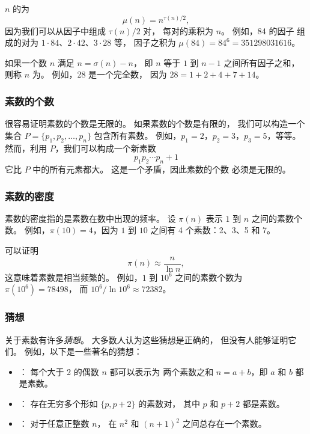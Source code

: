 $n$ 的为
\[\mu(n)=n^{\tau(n)/2},\]
因为我们可以从因子中组成 $\tau(n)/2$ 对，
每对的乘积为 $n$。
例如，84 的因子
组成的对为
$1 \cdot 84$、$2 \cdot 42$、$3 \cdot 28$ 等，
因子之积为 $\mu(84)=84^6=351298031616$。


如果一个数 $n$ 满足 $n=\sigma(n)-n$，
即 $n$ 等于 $1$ 到 $n-1$ 之间所有因子之和，
则称 $n$ 为。
例如，28 是一个完全数，
因为 $28=1+2+4+7+14$。

\subsubsection{素数的个数}

很容易证明素数的个数是无限的。
如果素数的个数是有限的，
我们可以构造一个集合 $P=\{p_1,p_2,\ldots,p_n\}$
包含所有素数。
例如，$p_1=2$，$p_2=3$，$p_3=5$，等等。
然而，利用 $P$，我们可以构成一个新素数
\[p_1 p_2 \cdots p_n+1\]
它比 $P$ 中的所有元素都大。
这是一个矛盾，因此素数的个数
必须是无限的。

\subsubsection{素数的密度}

素数的密度指的是素数在数中出现的频率。
设 $\pi(n)$ 表示 $1$ 到 $n$ 之间的素数个数。
例如，$\pi(10)=4$，因为
$1$ 到 $10$ 之间有 4 个素数：2、3、5 和 7。

可以证明
\[\pi(n) \approx \frac{n}{\ln n},\]
这意味着素数是相当频繁的。
例如，$1$ 到 $10^6$ 之间的素数个数为 $\pi(10^6)=78498$，
而 $10^6 / \ln 10^6 \approx 72382$。

\subsubsection{猜想}

关于素数有许多\emph{猜想}。
大多数人认为这些猜想是正确的，
但没有人能够证明它们。
例如，以下是一些著名的猜想：

\begin{itemize}
\item {}：
每个大于 2 的偶数 $n$ 都可以表示为
两个素数之和 $n=a+b$，即 $a$ 和 $b$ 都是素数。
\item {}：
存在无穷多个形如
$\{p,p+2\}$ 的素数对，
其中 $p$ 和 $p+2$ 都是素数。
\item {}：
对于任意正整数 $n$，
在 $n^2$ 和 $(n+1)^2$ 之间总存在一个素数。
\end{itemize}

